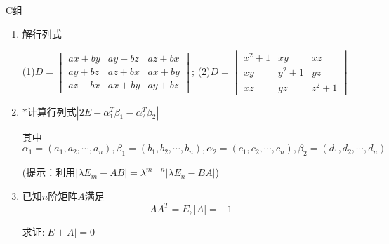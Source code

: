 \centerline{\heiti C组}
\begin{enumerate}
    \item 解行列式
    
    (1)$D=\begin{vmatrix}
    ax+by&ay+bz&az+bx\\
    ay+bz&az+bx&ax+by\\
    az+bx&ax+by&ay+bz
    \end{vmatrix}$;
    (2)$D=\begin{vmatrix}
    x^2+1&xy&xz\\
    xy&y^2+1&yz\\
    xz&yz&z^2+1
    \end{vmatrix}$
    \item $*$计算行列式$|2E-\alpha_1^T\beta_1-\alpha_2^T\beta_2|$
    
    其中$\alpha_1=(a_1, a_2, \cdots, a_n), \beta_1=(b_1,b_2,\cdots,b_n), 
    \alpha_2=(c_1, c_2, \cdots, c_n), \beta_2 = (d_1, d_2, \cdots, d_n)$
    
    (提示：利用$|\lambda E_m-AB|=\lambda^{m-n}|\lambda E_n-BA|$)
    
    \item 已知$n$阶矩阵$A$满足
    $$
    AA^T=E,|A|=-1
    $$
    
    求证:$|E+A|=0$
\end{enumerate}
